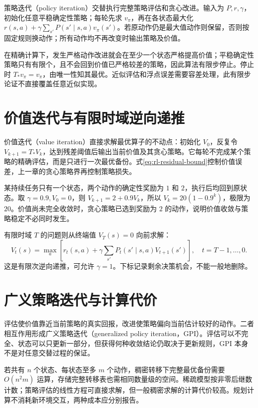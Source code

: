 \documentclass[UTF8,12pt,a4paper,fontset=fandol]{ctexbook}
\begin{document}
策略迭代（policy iteration）交替执行完整策略评估和贪心改进。输入为 $P,r,\gamma$，初始化任意平稳确定性策略；每轮先求 $v_\pi$，再在各状态最大化 $r(s,a)+\gamma\sum_{s'}P(s'\mid s,a)v_\pi(s')$。若原动作仍是最大值动作则保留，否则按固定规则换动作；所有动作均不再改变时输出策略及价值。

在精确计算下，发生严格动作改进就会在至少一个状态严格提高价值；平稳确定性策略只有有限个，且不会回到价值已严格较差的策略，因此算法有限步停止。停止时 $T_*v_\pi=v_\pi$，由唯一性知其最优。近似评估和浮点误差需要容差处理，此有限步论证不直接覆盖任意近似实现。

\section{价值迭代与有限时域逆向递推}

价值迭代（value iteration）直接求解最优算子的不动点：初始化 $V_0$，反复令 $V_{k+1}=T_*V_k$，达到残差阈值后输出当前价值及其贪心策略。它每轮不完成某个策略的精确评估，而是只进行一次最优备份。式\eqref{eq:rl-residual-bound}控制价值误差，上一章的贪心策略界再控制策略损失。

\begin{example}[一状态价值迭代]
某持续任务只有一个状态，两个动作的确定性奖励为 $1$ 和 $2$，执行后均回到原状态。取 $\gamma=0.9,V_0=0$，则 $V_{k+1}=2+0.9V_k$，所以 $V_k=20(1-0.9^k)$，极限为 $20$。价值尚未完全收敛时，贪心策略已选到奖励为 $2$ 的动作，说明价值收敛与策略稳定不必同时发生。
\end{example}

有限时域 $T$ 的问题则从终端值 $V_T(s)=0$ 向前求解：
\[
V_t(s)=\max_a\left[r_t(s,a)+\gamma\sum_{s'}P_t(s'\mid s,a)V_{t+1}(s')\right],\quad t=T-1,\ldots,0.
\]
这是有限次逆向递推，可允许 $\gamma=1$。下标记录剩余决策机会，不能一般地删除。

\section{广义策略迭代与计算代价}

评估使价值靠近当前策略的真实回报，改进使策略偏向当前估计较好的动作。二者相互作用形成广义策略迭代（generalized policy iteration，GPI）。评估可以不完全、状态可以只更新一部分，但获得何种收敛结论仍取决于更新规则，GPI 本身不是对任意交替过程的保证。

若共有 $n$ 个状态、每状态至多 $m$ 个动作，稠密转移下完整最优备份需要 $O(n^2m)$ 运算，存储完整转移表也需相同数量级的空间。稀疏模型按非零后继数计数；策略评估的线性方程可直接求解，但一般稠密求解的计算代价较高。规划计算不消耗新环境交互，两种成本应分别报告。
\end{document}
